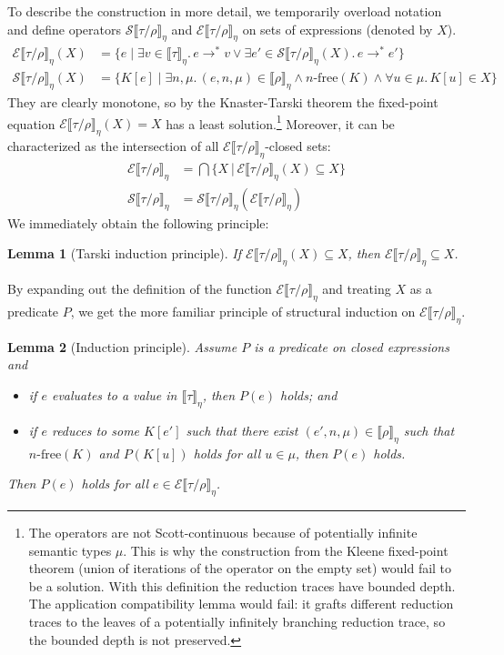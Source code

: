 \documentclass[a4paper, 11pt,titlepage, openright, twoside]{report}
\newcommand{\E}{\mathcal{E}}
\renewcommand{\S}{\mathcal{S}}
\newcommand{\Free}{\textrm{-}\mathrm{free}}
\newcommand{\+}{\enspace}
\newtheorem{lemma}{Lemma}
\begin{document}
To describe the construction in more detail, we temporarily overload notation and define
operators $\S⟦τ/ρ⟧_η$ and $\E⟦τ/ρ⟧_η$ on sets of expressions (denoted by $X$).
\begin{align*}
	\E⟦τ/ρ⟧_η(X) &=
	\{ e \mid ∃v∈⟦τ⟧_η.\, e →^* v ∨ ∃e'∈\S⟦τ/ρ⟧_η(X).\, e →^* e' \} \\
	\S⟦τ/ρ⟧_η(X) &= \{ K[e] \mid ∃n,μ.\, (e,n,μ)∈⟦ρ⟧_η  ∧ n\Free(K) ∧ ∀u∈μ.\, K[u]∈X \}
\end{align*}%
They are clearly monotone,
so by the Knaster-Tarski theorem %
the fixed-point equation $\E⟦τ/ρ⟧_η(X) = X$ has a least solution.\footnote{
	The operators are not Scott-continuous because of potentially infinite semantic
	types $μ$.
	This is why the construction from the Kleene fixed-point theorem (union of
	iterations of the operator on the empty set)
	would fail to be a solution.
	With this definition the reduction traces have bounded depth.
	The application compatibility lemma would fail:
	it grafts different reduction traces to the leaves of a
	potentially infinitely branching reduction trace,
	so the bounded depth is not preserved.
}
Moreover, it can be characterized as the intersection of all
$\E⟦τ/ρ⟧_η$-closed sets:
\begin{align*}
	\E⟦τ/ρ⟧_η &= \bigcap \{ X │ \E⟦τ/ρ⟧_η(X) ⊆ X \} \\
	\S⟦τ/ρ⟧_η &= \S⟦τ/ρ⟧_η(\E⟦τ/ρ⟧_η)
\end{align*}
We immediately obtain the following principle:

\begin{lemma}[Tarski induction principle]\label{tarski-induction}
	If $\E⟦τ/ρ⟧_η(X) ⊆ X$, then $\E⟦τ/ρ⟧_η ⊆ X$.
\end{lemma}

By expanding out the definition of the function $\E⟦τ/ρ⟧_η$
and treating $X$ as a predicate $P$,
we get the more familiar principle of structural induction on $\E⟦τ/ρ⟧_η$.
\begin{lemma}[Induction principle]\label{induction}
	Assume $P$ is a predicate on closed expressions and
\begin{itemize}
	\item if $e$ evaluates to a value in $⟦τ⟧_η$, then $P(e)$ holds; and
	\item if $e$ reduces to some $K[e']$ such that there exist $(e',n,μ)∈⟦ρ⟧_η$ such that $n\Free(K)$
		and $P(K[u])$ holds for all $u∈μ$, then $P(e)$ holds.
\end{itemize}
	Then $P(e)$ holds for all $e ∈ \E⟦τ/ρ⟧_η$.
\end{lemma}
\end{document}
